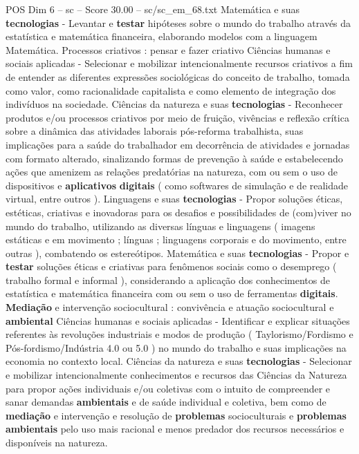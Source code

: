 \begin{textsample}{POS Dim 6 – sc – Score 30.00 – sc/sc\_em\_68.txt}
Matemática e suas \textbf{tecnologias} - Levantar e \textbf{testar} hipóteses sobre o mundo do trabalho através da estatística e matemática financeira, elaborando modelos com a linguagem Matemática.
Processos criativos : pensar e fazer criativo Ciências humanas e sociais aplicadas - Selecionar e mobilizar intencionalmente recursos criativos a fim de entender as diferentes expressões sociológicas do conceito de trabalho, tomada como valor, como racionalidade capitalista e como elemento de integração dos indivíduos na sociedade.
Ciências da natureza e suas \textbf{tecnologias} - Reconhecer produtos e/ou processos criativos por meio de fruição, vivências e reflexão crítica sobre a dinâmica das atividades laborais pós-reforma trabalhista, suas implicações para a saúde do trabalhador em decorrência de atividades e jornadas com formato alterado, sinalizando formas de prevenção à saúde e estabelecendo ações que amenizem as relações predatórias na natureza, com ou sem o uso de dispositivos e \textbf{aplicativos} \textbf{digitais} ( como softwares de simulação e de realidade virtual, entre outros ).
Linguagens e suas \textbf{tecnologias} - Propor soluções éticas, estéticas, criativas e inovadoras para os desafios e possibilidades de (com)viver no mundo do trabalho, utilizando as diversas línguas e linguagens ( imagens estáticas e em movimento ; línguas ; linguagens corporais e do movimento, entre outras ), combatendo os estereótipos.
Matemática e suas \textbf{tecnologias} - Propor e \textbf{testar} soluções éticas e criativas para fenômenos sociais como o desemprego ( trabalho formal e informal ), considerando a aplicação dos conhecimentos de estatística e matemática financeira com ou sem o uso de ferramentas \textbf{digitais}. \textbf{Mediação} e intervenção sociocultural : convivência e atuação sociocultural e \textbf{ambiental} Ciências humanas e sociais aplicadas - Identificar e explicar situações referentes às revoluções industriais e modos de produção ( Taylorismo/Fordismo e Pós-fordismo/Indústria 4.0 ou 5.0 ) no mundo do trabalho e suas implicações na economia no contexto local.
Ciências da natureza e suas \textbf{tecnologias} - Selecionar e mobilizar intencionalmente conhecimentos e recursos das Ciências da Natureza para propor ações individuais e/ou coletivas com o intuito de compreender e sanar demandas \textbf{ambientais} e de saúde individual e coletiva, bem como de \textbf{mediação} e intervenção e resolução de \textbf{problemas} socioculturais e \textbf{problemas} \textbf{ambientais} pelo uso mais racional e menos predador dos recursos necessários e disponíveis na natureza.

\end{textsample}
